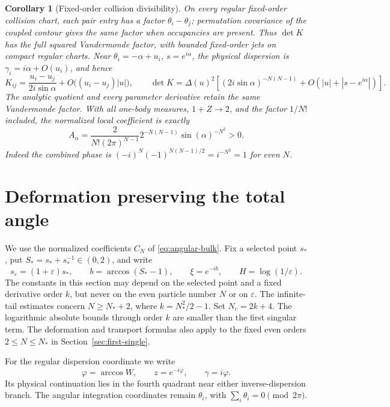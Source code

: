 \documentclass[11pt]{article}
\numberwithin{equation}{section}
\newtheorem{corollary}[theorem]{Corollary}
\theoremstyle{remark}\newtheorem{remark}[theorem]{Remark}
\begin{document}
\begin{corollary}[Fixed-order collision divisibility]
\label{lem:alternating-division}
On every regular fixed-order collision chart, each pair entry
has a factor $\theta_i-\theta_j$; permutation covariance of
the coupled contour gives the same factor when occupancies
are present.  Thus $\det K$ has the full squared Vandermonde
factor, with bounded fixed-order jets on compact regular
charts.  Near $\theta_i=-\alpha+u_i$, $s=e^{i\alpha}$, the
physical dispersion is $\gamma_i=i\alpha+O(u_i)$, and hence
\[
 K_{ij}=\frac{u_i-u_j}{2i\sin\alpha}
          +O\bigl((u_i-u_j)|u|\bigr),\qquad
 \det K=\Delta(u)^2\left[
 (2i\sin\alpha)^{-N(N-1)}+O(|u|+|s-e^{i\alpha}|)\right].
\]
The analytic quotient and every parameter derivative retain
the same Vandermonde factor.  With all one-body measures,
$1+Z\to2$, and the factor $1/N!$ included, the normalized
local coefficient is exactly
\[
 A_\alpha=\frac{2}{N!(2\pi)^{N-1}}
           2^{-N(N-1)}\sin(\alpha)^{-N^2}>0.
\]
Indeed the combined phase is
$(-i)^N(-1)^{N(N-1)/2}=i^{-N^2}=1$ for even $N$.
\end{corollary}

\section{Deformation preserving the total angle}
\label{sec:constrained-deformation}

We use the normalized coefficients $C_N$ of
\eqref{eq:angular-bulk}.  Fix a selected point $s_*$, put
$S_*=s_*+s_*^{-1}\in(0,2)$, and write
\[
 s_\varepsilon=(1+\varepsilon)s_*,\qquad
 b=\arccos(S_*-1),\qquad \xi=e^{-ib},\qquad
 H=\log(1/\varepsilon).
\]
The constants in this section may depend on the selected point and a
fixed derivative order $k$, but never on the even particle number $N$
or on $\varepsilon$.  The infinite-tail estimates concern $N\ge N_*+2$, where
$k=N_*^2/2-1$. Set $N_c=2k+4$.
The logarithmic absolute bounds through order $k$ are smaller than
the first singular term. The deformation and transport formulas also
apply to the fixed even orders $2\le N\le N_*$ in
Section~\ref{sec:first-single}.

For the regular dispersion coordinate we write
\[
 \varphi=\arccos W,\qquad z=e^{-i\varphi},\qquad
 \gamma=i\varphi.
\]
Its physical continuation lies in the fourth quadrant near either
inverse-dispersion branch.  The angular integration coordinates remain
$\theta_i$, with $\sum_i\theta_i=0\pmod {2\pi}$.
\end{document}
